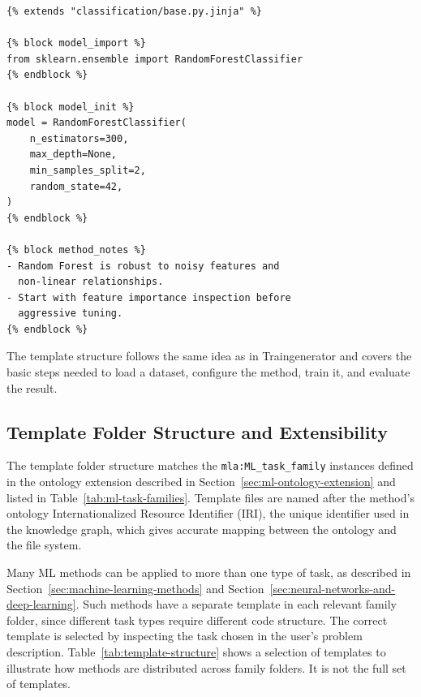 \begin{lstlisting}[caption={[Method template]The random forest template for classification, which extends the base template and overrides its blocks.}, 
  label={lst:method-template}, keepspaces=true]
{% extends "classification/base.py.jinja" %}

{% block model_import %}
from sklearn.ensemble import RandomForestClassifier
{% endblock %}

{% block model_init %}
model = RandomForestClassifier(
    n_estimators=300,
    max_depth=None,
    min_samples_split=2,
    random_state=42,
)
{% endblock %}

{% block method_notes %}
- Random Forest is robust to noisy features and
  non-linear relationships.
- Start with feature importance inspection before
  aggressive tuning.
{% endblock %}
\end{lstlisting}

The template structure follows the same idea as in 
Traingenerator \parencite{rieke2021traingenerator} and covers the basic steps needed to load a 
dataset, configure the method, train it, and evaluate the 
result.

\subsection{Template Folder Structure and Extensibility}
\label{sec:template-structure-and-extensibility}

The template folder structure matches the 
\texttt{mla:ML\_task\_family} instances defined in the 
ontology extension described in 
Section~\ref{sec:ml-ontology-extension} and listed in 
Table~\ref{tab:ml-task-families}. Template files are 
named after the method's ontology Internationalized Resource Identifier (IRI),
the unique identifier used in the knowledge graph,
which gives accurate mapping between the ontology and the file system.

Many ML methods can be applied to more than one type of 
task, as described in 
Section~\ref{sec:machine-learning-methods} and 
Section~\ref{sec:neural-networks-and-deep-learning}. 
Such methods have a separate template in each relevant 
family folder, since different task types require 
different code structure. The correct template is selected 
by inspecting the task chosen in the user's problem description. 
Table~\ref{tab:template-structure} shows a selection of
templates to illustrate how methods are distributed across family
folders. It is not the full set of templates.


